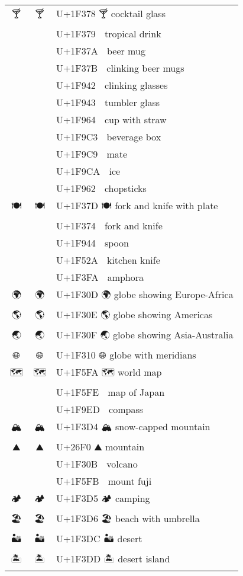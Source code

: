 \documentclass[a4paper,12pt]{ltjarticle}
\newcommand{\fontA}[1]{{\fontspec[RawFeature={mode=harf,+dist,+ccmp}]{Segoe UI Emoji} #1}}
\newcommand{\fontB}[1]{{\fontspec[RawFeature={mode=harf,+dist,+ccmp}]{Noto Color Emoji} #1}}
\begin{document}
\begin{longtable}[c]{ccp{0.8\linewidth}}
\fontA{🍸}&\fontB{🍸}&U+1F378 🍸 cocktail glass\\
\fontA{🍹}&\fontB{🍹}&U+1F379 🍹 tropical drink\\
\fontA{🍺}&\fontB{🍺}&U+1F37A 🍺 beer mug\\
\fontA{🍻}&\fontB{🍻}&U+1F37B 🍻 clinking beer mugs\\
\fontA{🥂}&\fontB{🥂}&U+1F942 🥂 clinking glasses\\
\fontA{🥃}&\fontB{🥃}&U+1F943 🥃 tumbler glass\\
\fontA{🥤}&\fontB{🥤}&U+1F964 🥤 cup with straw\\
\fontA{🧃}&\fontB{🧃}&U+1F9C3 🧃 beverage box\\
\fontA{🧉}&\fontB{🧉}&U+1F9C9 🧉 mate\\
\fontA{🧊}&\fontB{🧊}&U+1F9CA 🧊 ice\\
\fontA{🥢}&\fontB{🥢}&U+1F962 🥢 chopsticks\\
\fontA{🍽}&\fontB{🍽}&U+1F37D 🍽 fork and knife with plate\\
\fontA{🍴}&\fontB{🍴}&U+1F374 🍴 fork and knife\\
\fontA{🥄}&\fontB{🥄}&U+1F944 🥄 spoon\\
\fontA{🔪}&\fontB{🔪}&U+1F52A 🔪 kitchen knife\\
\fontA{🏺}&\fontB{🏺}&U+1F3FA 🏺 amphora\\
\fontA{🌍}&\fontB{🌍}&U+1F30D 🌍 globe showing Europe-Africa\\
\fontA{🌎}&\fontB{🌎}&U+1F30E 🌎 globe showing Americas\\
\fontA{🌏}&\fontB{🌏}&U+1F30F 🌏 globe showing Asia-Australia\\
\fontA{🌐}&\fontB{🌐}&U+1F310 🌐 globe with meridians\\
\fontA{🗺}&\fontB{🗺}&U+1F5FA 🗺 world map\\
\fontA{🗾}&\fontB{🗾}&U+1F5FE 🗾 map of Japan\\
\fontA{🧭}&\fontB{🧭}&U+1F9ED 🧭 compass\\
\fontA{🏔}&\fontB{🏔}&U+1F3D4 🏔 snow-capped mountain\\
\fontA{⛰}&\fontB{⛰}&U+26F0 ⛰ mountain\\
\fontA{🌋}&\fontB{🌋}&U+1F30B 🌋 volcano\\
\fontA{🗻}&\fontB{🗻}&U+1F5FB 🗻 mount fuji\\
\fontA{🏕}&\fontB{🏕}&U+1F3D5 🏕 camping\\
\fontA{🏖}&\fontB{🏖}&U+1F3D6 🏖 beach with umbrella\\
\fontA{🏜}&\fontB{🏜}&U+1F3DC 🏜 desert\\
\fontA{🏝}&\fontB{🏝}&U+1F3DD 🏝 desert island\\

\end{longtable}
\end{document}
